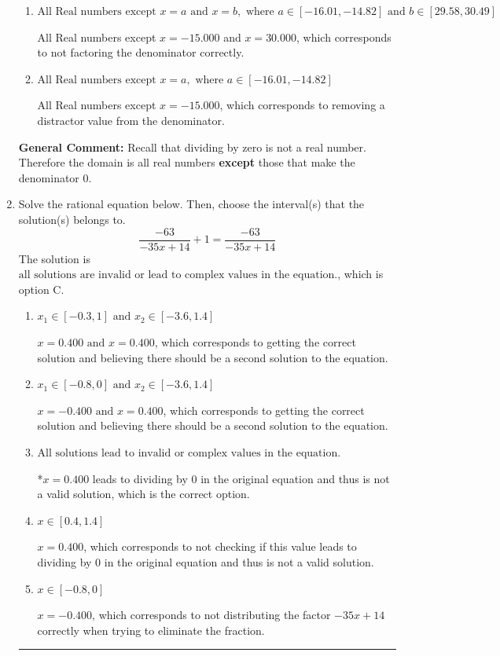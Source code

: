 \documentclass{extbook}[14pt]
\newcommand{\litem}[1]{\item #1

\rule{\textwidth}{0.4pt}}
\begin{document}
\begin{enumerate}
{\begin{enumerate}[label=\Alph*.]
All Real numbers except $x = -0.600$, which corresponds to removing only 1 value from the denominator.
\item \( \text{All Real numbers except } x = a \text{ and } x = b, \text{ where } a \in [-16.01, -14.82] \text{ and } b \in [29.58, 30.49] \)

All Real numbers except $x = -15.000$ and $x = 30.000$, which corresponds to not factoring the denominator correctly.
\item \( \text{All Real numbers except } x = a, \text{ where } a \in [-16.01, -14.82] \)

All Real numbers except $x = -15.000$, which corresponds to removing a distractor value from the denominator.
\end{enumerate}

\textbf{General Comment:} Recall that dividing by zero is not a real number. Therefore the domain is all real numbers \textbf{except} those that make the denominator 0.
}
\litem{
Solve the rational equation below. Then, choose the interval(s) that the solution(s) belongs to.
\[ \frac{-63}{-35x + 14} + 1 = \frac{-63}{-35x + 14} \]The solution is \( \text{all solutions are invalid or lead to complex values in the equation.} \), which is option C.\begin{enumerate}[label=\Alph*.]
\item \( x_1 \in [-0.3, 1] \text{ and } x_2 \in [-3.6,1.4] \)

$x = 0.400 \text{ and } x = 0.400$, which corresponds to getting the correct solution and believing there should be a second solution to the equation.
\item \( x_1 \in [-0.8, 0] \text{ and } x_2 \in [-3.6,1.4] \)

$x = -0.400 \text{ and } x = 0.400$, which corresponds to getting the correct solution and believing there should be a second solution to the equation.
\item \( \text{All solutions lead to invalid or complex values in the equation.} \)

*$x = 0.400$ leads to dividing by 0 in the original equation and thus is not a valid solution, which is the correct option.
\item \( x \in [0.4,1.4] \)

$x = 0.400$, which corresponds to not checking if this value leads to dividing by 0 in the original equation and thus is not a valid solution.
\item \( x \in [-0.8,0] \)

$x = -0.400$, which corresponds to not distributing the factor $-35x + 14$ correctly when trying to eliminate the fraction.
\end{enumerate}

}
\end{enumerate}
\end{document}
